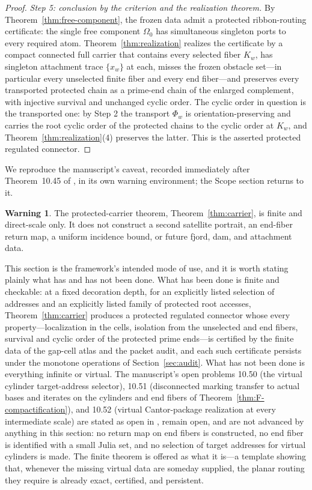\documentclass[11pt,reqno]{amsart}
\theoremstyle{definition}
\newtheorem{warning}[theorem]{Warning}
\theoremstyle{remark}
\begin{document}
\begin{proof}
\emph{Step 5: conclusion by the criterion and the realization theorem.}
By Theorem~\ref{thm:free-component}, the frozen data admit a protected
ribbon-routing certificate: the single free component $\Omega_0$ has
simultaneous singleton ports to every required atom.
Theorem~\ref{thm:realization} realizes the certificate by a compact
connected full carrier that contains every selected fiber $K_w$, has
singleton attachment trace $\{x_w\}$ at each, misses the frozen obstacle
set---in particular every unselected finite fiber and every end
fiber---and preserves every transported protected chain as a prime-end
chain of the enlarged complement, with injective survival and unchanged
cyclic order.  The cyclic order in question is the transported one: by
Step 2 the transport $\Phi_w$ is orientation-preserving and carries the
root cyclic order of the protected chains to the cyclic order at $K_w$,
and Theorem~\ref{thm:realization}(4) preserves the latter.  This is the
asserted protected regulated connector.
\end{proof}

We reproduce the manuscript's caveat, recorded immediately after
Theorem~10.45 of \cite{MWman}, in its own warning environment; the Scope
section returns to it.

\begin{warning}\label{warn:F-finite-scale}
The protected-carrier theorem, Theorem~\ref{thm:carrier}, is finite and
direct-scale only.  It does not construct a second satellite portrait, an
end-fiber return map, a uniform incidence bound, or future fjord, dam,
and attachment data.
\end{warning}

This section is the framework's intended mode of use, and it is worth
stating plainly what has and has not been done.  What has been done is
finite and checkable: at a fixed decoration depth, for an explicitly
listed selection of addresses and an explicitly listed family of
protected root accesses, Theorem~\ref{thm:carrier} produces a protected
regulated connector whose every property---localization in the cells,
isolation from the unselected and end fibers, survival and cyclic order
of the protected prime ends---is certified by the finite data of the
gap-cell atlas and the packet audit, and each such certificate persists
under the monotone operations of Section~\ref{sec:audit}.  What has not
been done is everything infinite or virtual.  The manuscript's open
problems 10.50 (the virtual cylinder target-address selector), 10.51
(disconnected marking transfer to actual bases and iterates on the
cylinders and end fibers of Theorem~\ref{thm:F-compactification}), and
10.52 (virtual Cantor-package realization at every intermediate scale)
are stated as open in \cite{MWman}, remain open, and are not advanced by
anything in this section: no return map on end fibers is constructed, no
end fiber is identified with a small Julia set, and no selection of
target addresses for virtual cylinders is made.  The finite theorem is
offered as what it is---a template showing that, whenever the missing
virtual data are someday supplied, the planar routing they require is
already exact, certified, and persistent.
\end{document}
